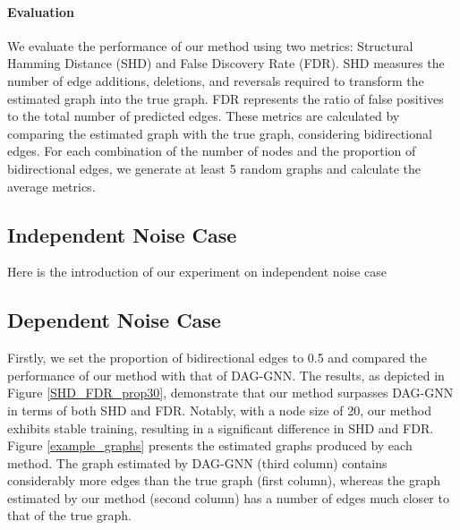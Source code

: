 \documentclass[10pt]{article}
\begin{document}
\paragraph*{Evaluation} We evaluate the performance of our method using two metrics: Structural Hamming Distance (SHD) and False Discovery Rate (FDR). SHD measures the number of edge additions, deletions, and reversals required to transform the estimated graph into the true graph. FDR represents the ratio of false positives to the total number of predicted edges. These metrics are calculated by comparing the estimated graph with the true graph, considering bidirectional edges. For each combination of the number of nodes and the proportion of bidirectional edges, we generate at least 5 random graphs and calculate the average metrics.

\subsection{Independent Noise Case}

Here is the introduction of our experiment on independent noise case

\subsection{Dependent Noise Case}

Firstly, we set the proportion of bidirectional edges to 0.5 and compared the performance of our method with that of DAG-GNN. The results, as depicted in Figure \ref*{SHD_FDR_prop30}, demonstrate that our method surpasses DAG-GNN in terms of both SHD and FDR. Notably, with a node size of 20, our method exhibits stable training, resulting in a significant difference in SHD and FDR. Figure \ref*{example_graphs} presents the estimated graphs produced by each method. The graph estimated by DAG-GNN (third column) contains considerably more edges than the true graph (first column), whereas the graph estimated by our method (second column) has a number of edges much closer to that of the true graph.
\end{document}
